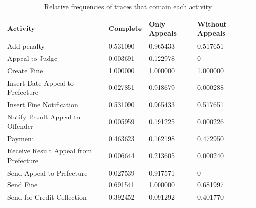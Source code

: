 \documentclass[12pt]{report}
\begin{document}
\begin{table}[H]
    \centering
    \begin{tabular}{|l|l|l|l|}
	\hline \textbf{Activity} & \textbf{Complete} & \textbf{Only Appeals} & \textbf{Without Appeals} \\
	\hline Add penalty                           &           0.531090 &           0.965433 &           0.517651 \\
	\hline Appeal to Judge                       &           0.003691 &           0.122978 &           0 \\
	\hline Create Fine                           &           1.000000 &           1.000000 &           1.000000 \\
	\hline Insert Date Appeal to Prefecture      &           0.027851 &           0.918679 &           0.000288 \\
	\hline Insert Fine Notification              &           0.531090 &           0.965433 &           0.517651 \\
	\hline Notify Result Appeal to Offender      &           0.005959 &           0.191225 &           0.000226 \\
	\hline Payment                               &           0.463623 &           0.162198 &           0.472950 \\
	\hline Receive Result Appeal from Prefecture &           0.006644 &           0.213605 &           0.000240 \\
	\hline Send Appeal to Prefecture             &           0.027539 &           0.917571 &           0 \\
	\hline Send Fine                             &           0.691541 &           1.000000 &           0.681997 \\
	\hline Send for Credit Collection            &           0.392452 &           0.091292 &           0.401770 \\
	\hline
    \end{tabular}
    \caption{Relative frequencies of traces that contain each activity}
    \label{tab:1c_traces}
\end{table}
\end{document}

